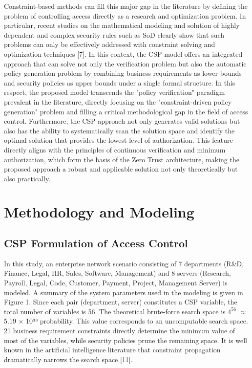 \documentclass[conference]{IEEEtran}
\begin{document}
Constraint-based methods can fill this major gap in the literature by defining the problem of controlling access directly as a research and optimization problem. In particular, recent studies on the mathematical modeling and solution of highly dependent and complex security rules such as SoD clearly show that such problems can only be effectively addressed with constraint solving and optimization techniques [7]. In this context, the CSP model offers an integrated approach that can solve not only the verification problem but also the automatic policy generation problem by combining business requirements as lower bounds and security policies as upper bounds under a single formal structure.
In this respect, the proposed model transcends the "policy verification" paradigm prevalent in the literature, directly focusing on the "constraint-driven policy generation" problem and filling a critical methodological gap in the field of access control. Furthermore, the CSP approach not only generates valid solutions but also has the ability to systematically scan the solution space and identify the optimal solution that provides the lowest level of authorization. This feature directly aligns with the principles of continuous verification and minimum authorization, which form the basis of the Zero Trust architecture, making the proposed approach a robust and applicable solution not only theoretically but also practically.

	\section{Methodology and Modeling}
	\label{sec:methodology}
	
	\subsection{CSP Formulation of Access Control}
   In this study, an enterprise network scenario consisting of 7 departments (R\&D, Finance, Legal, HR, Sales, Software, Management) and 8 servers (Research, Payroll, Legal, Code, Customer, Payment, Project, Management Server) is modeled. A summary of the system parameters used in the modeling is given in Figure 1. Since each pair (department, server) constitutes a CSP variable, the total number of variables is 56. The theoretical brute-force search space is $4^{56}$ $\approx$ 5.19 × 10³³ probability. This value corresponds to an uncomputable search space. 21 business requirement constraints directly determine the minimum value of most of the variables, while security policies prune the remaining space. It is well known in the artificial intelligence literature that constraint propagation dramatically narrows the search space [11].
\end{document}
